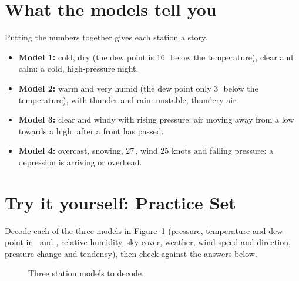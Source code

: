 \section{What the models tell you}

Putting the numbers together gives each station a story.
\begin{itemize}
\item \textbf{Model 1:} cold, dry (the dew point is 16\,\degF\ below the temperature), clear and calm: a cold, high-pressure night.
\item \textbf{Model 2:} warm and very humid (the dew point only 3\,\degF\ below the temperature), with thunder and rain: unstable, thundery air.
\item \textbf{Model 3:} clear and windy with rising pressure: air moving away from a low towards a high, after a front has passed.
\item \textbf{Model 4:} overcast, snowing, 27\,\degF, wind 25 knots and falling pressure: a depression is arriving or overhead.
\end{itemize}

\section{Try it yourself: Practice Set~\thechapter}

Decode each of the three models in Figure~\ref{p3-fig:practiceG} (pressure, temperature and dew point in \degF\ and \degC, relative humidity, sky cover, weather, wind speed and direction, pressure change and tendency), then check against the answers below.

\begin{figure}[ht]
\centering
\begin{minipage}{0.32\textwidth}\centering {}\end{minipage}
\begin{minipage}{0.32\textwidth}\centering {}\end{minipage}
\begin{minipage}{0.32\textwidth}\centering {}\end{minipage}
\caption{Three station models to decode.}\label{p3-fig:practiceG}
\end{figure}

